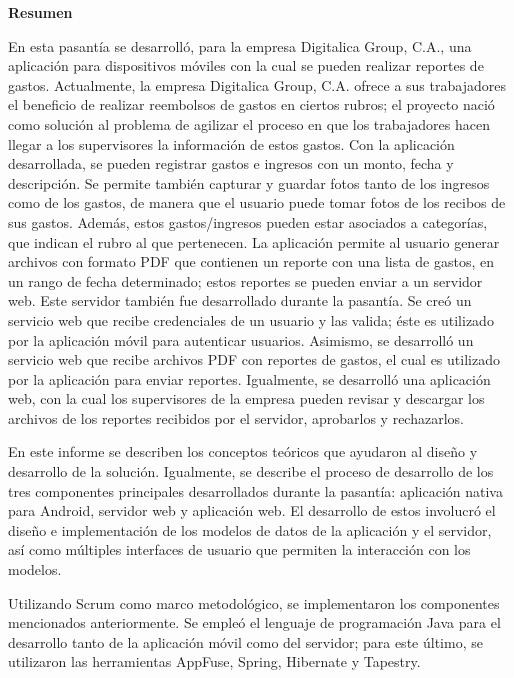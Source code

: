 \setcounter{page}{3}
\begin{center}
	{\bf Resumen}  %
\end{center}	

En esta pasantía se desarrolló, para la empresa Digitalica Group, C.A., una aplicación para dispositivos móviles con la cual se pueden realizar reportes de gastos. Actualmente, la empresa Digitalica Group, C.A. ofrece a sus trabajadores el beneficio de realizar reembolsos de gastos en ciertos rubros; el proyecto nació como solución al problema de agilizar el proceso en que los trabajadores hacen llegar a los supervisores la información de estos gastos. Con la aplicación desarrollada, se pueden registrar gastos e ingresos con un monto, fecha y descripción. Se permite también capturar y guardar fotos tanto de los ingresos como de los gastos, de manera que el usuario puede tomar fotos de los recibos de sus gastos. Además, estos gastos/ingresos pueden estar asociados a categorías, que indican el rubro al que pertenecen. La aplicación permite al usuario generar archivos con formato PDF que contienen un reporte con una lista de gastos, en un rango de fecha determinado; estos reportes se pueden enviar a un servidor web. Este servidor también fue desarrollado durante la pasantía. Se creó un servicio web que recibe credenciales de un usuario y las valida; éste es utilizado por la aplicación móvil para autenticar usuarios. Asimismo, se desarrolló un servicio web que recibe archivos PDF con reportes de gastos, el cual es utilizado por la aplicación para enviar reportes. Igualmente, se desarrolló una aplicación web, con la cual los supervisores de la empresa pueden revisar y descargar los archivos de los reportes recibidos por el servidor, aprobarlos y rechazarlos.

En este informe se describen los conceptos teóricos que ayudaron al diseño y desarrollo de la solución. Igualmente, se describe el proceso de desarrollo de los tres componentes principales desarrollados durante la pasantía: aplicación nativa para Android, servidor web y aplicación web. El desarrollo de estos involucró el diseño e implementación de los modelos de datos de la aplicación y el servidor, así como múltiples interfaces de usuario que permiten la interacción con los modelos. 

Utilizando Scrum como marco metodológico, se implementaron los componentes mencionados anteriormente. Se empleó el lenguaje de programación Java para el desarrollo tanto de la aplicación móvil como del servidor; para este último, se utilizaron las herramientas AppFuse, Spring, Hibernate y Tapestry.



